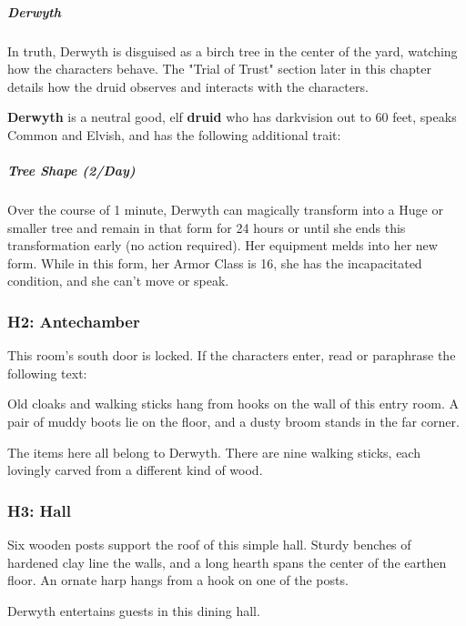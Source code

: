 \documentclass[10pt,a4paper,twoside,bg=print,twocolumn,openany,nodeprecatedcode]{dndbook}
\begin{document}
\subparagraph{Derwyth}
In truth, Derwyth is disguised as a birch tree in the center of the yard, watching how the characters behave. The "Trial of Trust" section later in this chapter details how the druid observes and interacts with the characters.

\textbf{Derwyth} is a neutral good, elf \textbf{druid} who has darkvision out to 60 feet, speaks Common and Elvish, and has the following additional trait:

\begin{DndReadAloud}{}
\subparagraph{Tree Shape (2/Day)}
Over the course of 1 minute, Derwyth can magically transform into a Huge or smaller tree and remain in that form for 24 hours or until she ends this transformation early (no action required). Her equipment melds into her new form. While in this form, her Armor Class is 16, she has the incapacitated condition, and she can't move or speak.

\end{DndReadAloud}

\subsubsection{H2: Antechamber}
This room's south door is locked. If the characters enter, read or paraphrase the following text:

\begin{DndReadAloud}{}
Old cloaks and walking sticks hang from hooks on the wall of this entry room. A pair of muddy boots lie on the floor, and a dusty broom stands in the far corner.

\end{DndReadAloud}

The items here all belong to Derwyth. There are nine walking sticks, each lovingly carved from a different kind of wood.

\subsubsection{H3: Hall}
\begin{DndReadAloud}{}
Six wooden posts support the roof of this simple hall. Sturdy benches of hardened clay line the walls, and a long hearth spans the center of the earthen floor. An ornate harp hangs from a hook on one of the posts.

\end{DndReadAloud}

Derwyth entertains guests in this dining hall.
\end{document}
